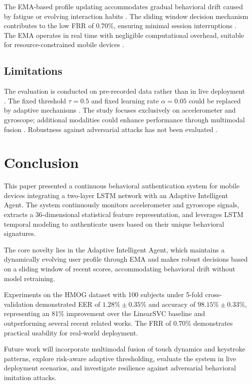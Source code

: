 \documentclass[3p,times,procedia]{elsarticle}
\begin{document}
The EMA-based profile updating accommodates gradual behavioral
drift caused by fatigue or evolving interaction habits
\cite{verma_data-driven_2022}. The sliding window decision mechanism
contributes to the low FRR of $0.70\%$, ensuring minimal
session interruptions \cite{stylios_behavioral_2021}. The EMA operates in
real time with negligible computational overhead, suitable for
resource-constrained mobile devices \cite{incel_dakota_2021}.

\subsection{Limitations}

The evaluation is conducted on pre-recorded data rather than
in live deployment \cite{alzubaidi_authentication_2016}. The fixed threshold
$\tau = 0.5$ and fixed learning rate $\alpha = 0.05$ could
be replaced by adaptive mechanisms \cite{abuhamad_autosen_2020}.
The study focuses exclusively on accelerometer and gyroscope;
additional modalities could enhance performance through
multimodal fusion \cite{saevanee_continuous_2015}. Robustness against
adversarial attacks has not been evaluated \cite{verma_data-driven_2022}.


\section{Conclusion}
\label{sec:conclusion}

This paper presented a continuous behavioral authentication
system for mobile devices integrating a two-layer LSTM network
with an Adaptive Intelligent Agent. The system continuously
monitors accelerometer and gyroscope signals, extracts a
36-dimensional statistical feature representation, and
leverages LSTM temporal modeling to authenticate users based
on their unique behavioral signatures.

The core novelty lies in the Adaptive Intelligent Agent, which
maintains a dynamically evolving user profile through EMA and
makes robust decisions based on a sliding window of recent
scores, accommodating behavioral drift without model retraining.

Experiments on the HMOG dataset with 100 subjects under 5-fold
cross-validation demonstrated EER of $1.28\% \pm 0.35\%$ and
accuracy of $98.15\% \pm 0.33\%$, representing an 81\%
improvement over the LinearSVC baseline and outperforming
several recent related works. The FRR of $0.70\%$ demonstrates
practical usability for real-world deployment.

Future work will incorporate multimodal fusion of touch
dynamics and keystroke patterns, explore risk-aware adaptive
thresholding, evaluate the system in live deployment scenarios,
and investigate resilience against adversarial behavioral
imitation attacks.




\end{document}
